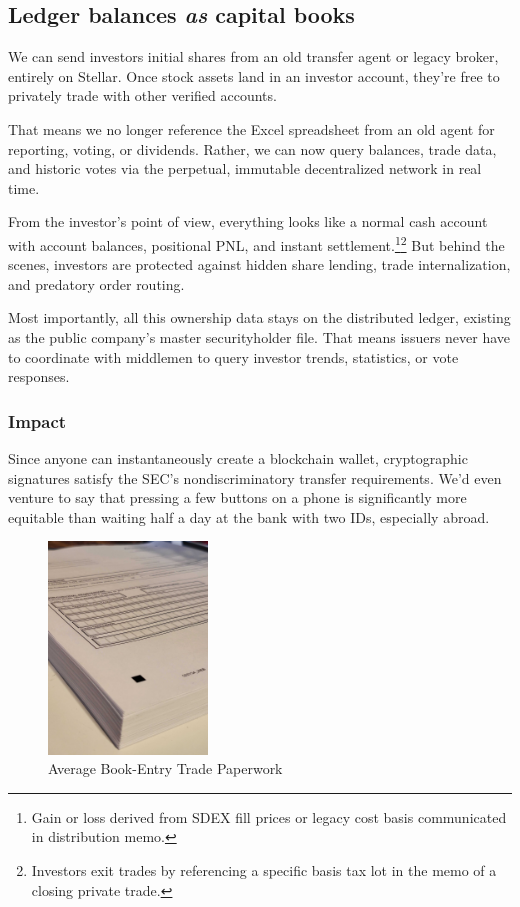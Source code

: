 \documentclass[11pt, english]{article}
\begin{document}
\begin{multicols}{2}
\subsection{Ledger balances \textit{as} capital books}

We can send investors initial shares from an old transfer agent or legacy broker, entirely on Stellar. Once stock assets land in an investor account, they're free to privately trade with other verified accounts.

That means we no longer reference the Excel spreadsheet from an old agent for reporting, voting, or dividends. Rather, we can now query balances, trade data, and historic votes via the perpetual, immutable decentralized network in real time.

From the investor's point of view, everything looks like a normal cash account with account balances, positional PNL, and instant settlement.\footnote{Gain or loss derived from SDEX fill prices or legacy cost basis communicated in distribution memo.}\footnote{Investors exit trades by referencing a specific basis tax lot in the memo of a closing private trade.} But behind the scenes, investors are protected against hidden share lending, trade internalization, and predatory order routing.

Most importantly, all this ownership data stays on the distributed ledger, existing as the public company's master securityholder file. That means issuers never have to coordinate with middlemen to query investor trends, statistics, or vote responses.

\subsubsection{Impact}

Since anyone can instantaneously create a blockchain wallet, cryptographic signatures satisfy the SEC's nondiscriminatory transfer requirements. We'd even venture to say that pressing a few buttons on a phone is significantly more equitable than waiting half a day at the bank with two IDs, especially abroad.

\begin{figure}[H]
    \centering
    \includegraphics[width=120pt]{imgs/paperwork.jpg}
    \caption{Average Book-Entry Trade Paperwork}
\end{figure}


\end{multicols}
\end{document}
